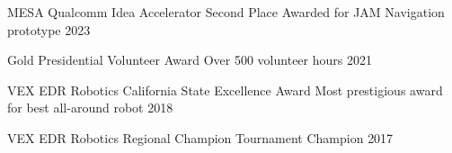 \begin{cvhonors}

\cvhonor
{MESA Qualcomm Idea Accelerator Second Place} %
{Awarded for JAM Navigation prototype} %
{} %
{2023} %


\cvhonor
{Gold Presidential Volunteer Award} %
{Over 500 volunteer hours} %
{} %
{2021} %


\cvhonor
{VEX EDR Robotics California State Excellence Award} %
{Most prestigious award for best all-around robot} %
{} %
{2018} %




\cvhonor
{VEX EDR Robotics Regional Champion} %
{Tournament Champion} %
{} %
{2017} %

\end{cvhonors}